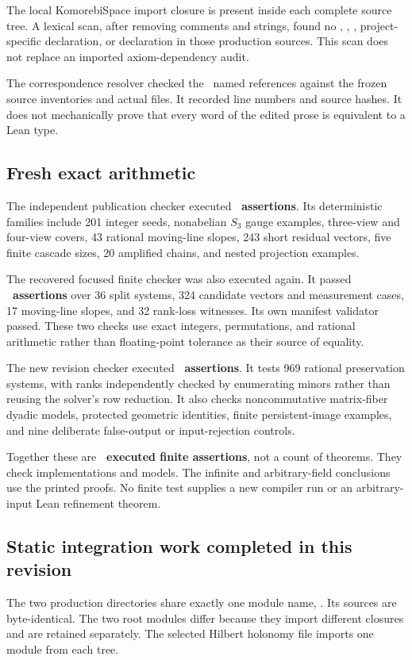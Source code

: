 \documentclass[11pt]{article}
\begin{document}
The local KomorebiSpace import closure is present inside each complete source tree. A lexical scan, after removing comments and strings, found no , , , project-specific  declaration, or  declaration in those production sources. This scan does not replace an imported axiom-dependency audit.

The correspondence resolver checked the \EditionReferences\ named references against the frozen source inventories and actual files. It recorded line numbers and source hashes. It does not mechanically prove that every word of the edited prose is equivalent to a Lean type.

\subsection{Fresh exact arithmetic}
The independent publication checker executed \textbf{\EditionOriginalChecks\ assertions}. Its deterministic families include 201 integer seeds, nonabelian \(S_3\) gauge examples, three-view and four-view covers, 43 rational moving-line slopes, 243 short residual vectors, five finite cascade sizes, 20 amplified chains, and nested projection examples.

The recovered focused finite checker was also executed again. It passed \textbf{\EditionRecoveredChecks\ assertions} over 36 split systems, 324 candidate vectors and measurement cases, 17 moving-line slopes, and 32 rank-loss witnesses. Its own manifest validator passed. These two checks use exact integers, permutations, and rational arithmetic rather than floating-point tolerance as their source of equality.

The new revision checker executed \textbf{\EditionRevisionChecks\ assertions}. It tests 969 rational preservation systems, with ranks independently checked by enumerating minors rather than reusing the solver's row reduction. It also checks noncommutative matrix-fiber dyadic models, protected geometric identities, finite persistent-image examples, and nine deliberate false-output or input-rejection controls.

Together these are \textbf{\EditionTotalChecks\ executed finite assertions}, not a count of theorems. They check implementations and models. The infinite and arbitrary-field conclusions use the printed proofs. No finite test supplies a new compiler run or an arbitrary-input Lean refinement theorem.

\subsection{Static integration work completed in this revision}
The two production directories share exactly one module name, . Its sources are byte-identical. The two root modules differ because they import different closures and are retained separately. The selected Hilbert holonomy file imports one module from each tree.
\end{document}
